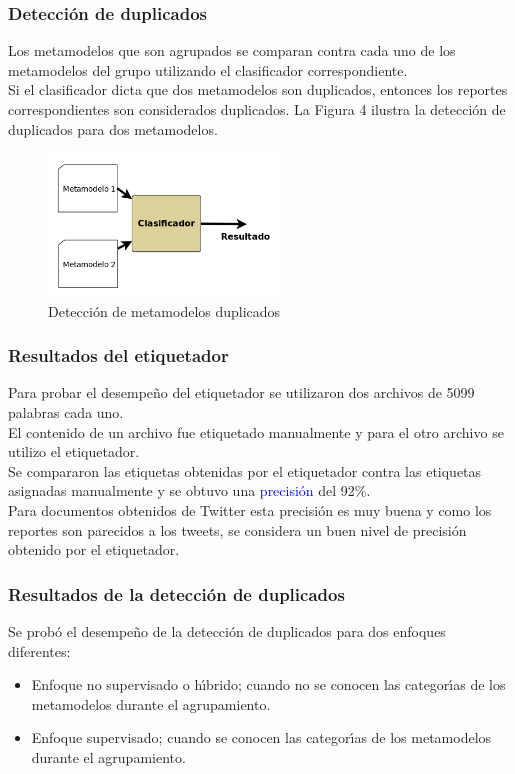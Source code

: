 \documentclass{beamer}
\begin{document}
\begin{frame}
  \frametitle{Detecci\'{o}n de duplicados}
  Los metamodelos que son agrupados se comparan contra cada uno de los metamodelos del grupo utilizando el clasificador correspondiente.\\
  \vspace{2 mm}
  Si el clasificador dicta que dos metamodelos son duplicados, entonces los reportes correspondientes son considerados duplicados. La Figura 4 ilustra la detecci\'{o}n de duplicados para dos metamodelos.

  \begin{figure}
    \centering
    \includegraphics[width = 0.55\textwidth]{imagenes/clasificador.png}
    \caption{Detecci\'{o}n de metamodelos duplicados}
    \label{metamodelosDuplicados}
  \end{figure}
\end{frame}


\begin{frame}
  \frametitle{Resultados del etiquetador}
  Para probar el desempe\~{n}o del etiquetador se utilizaron dos archivos de 5099 palabras cada uno.\\
  \vspace{2mm}
  El contenido de un archivo fue etiquetado manualmente y para el otro archivo se utilizo el etiquetador.\\
  \vspace{2mm}
  Se compararon las etiquetas obtenidas por el etiquetador contra las etiquetas asignadas manualmente y se obtuvo una \textcolor{blue}{precisi\'{o}n} del 92\%.\\
  \vspace{2mm}
Para documentos obtenidos de Twitter esta precisi\'{o}n es muy buena y como los reportes son parecidos a los tweets, se considera un buen nivel de precisi\'{o}n obtenido por el etiquetador.
\end{frame}

\begin{frame}
  \frametitle{Resultados de la detecci\'{o}n de duplicados}
  Se prob\'{o} el desempe\~{n}o de la detecci\'{o}n de duplicados para dos enfoques diferentes:
  \vspace{2mm}
  \begin{itemize}
  \item Enfoque no supervisado o h\'{\i}brido; cuando no se conocen las categor\'{\i}as de los metamodelos durante el agrupamiento.
  \vspace{2mm}
  \item Enfoque supervisado; cuando se conocen las categor\'{\i}as de los metamodelos durante el agrupamiento. 
  \end{itemize}

\end{frame}
\end{document}
